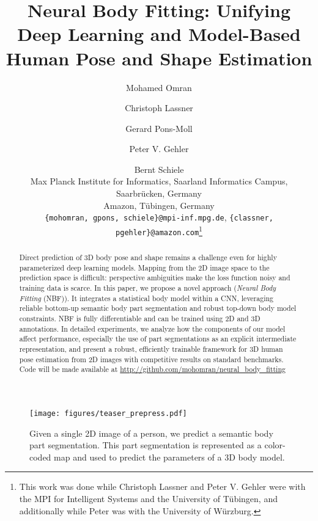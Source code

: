 \documentclass[10pt,twocolumn,letterpaper]{article}
\begin{document}
	
\title{Neural Body Fitting: Unifying Deep Learning and Model-Based Human Pose and Shape Estimation}

\author{Mohamed Omran\\
\and Christoph Lassner\footnotemark[1]\\
\and Gerard Pons-Moll\\
\and Peter V. Gehler\footnotemark[1]\\
\and Bernt Schiele\\Max Planck Institute for Informatics, Saarland Informatics Campus, Saarbr\"ucken, Germany\\
Amazon, T\"ubingen, Germany\\
{\tt\small \{mohomran, gpons, schiele\}@mpi-inf.mpg.de}, {\tt\small \{classner, pgehler\}@amazon.com}\thanks{This work was done while Christoph Lassner and Peter V. Gehler were with the MPI for Intelligent Systems and the University of T\"ubingen, and additionally while Peter was with the University of W\"urzburg.}\\
}

\maketitle

\begin{figure*}[t]
\caption{Given a single 2D image of a person, we predict a semantic body part segmentation. This part segmentation is represented as a color-coded map and used to predict the parameters of a 3D body model.}
\texttt{[image: figures/teaser\_prepress.pdf]}
\end{figure*}

\begin{abstract}
Direct prediction of 3D body pose and shape remains a challenge even for
highly parameterized deep learning models. Mapping from the 2D image space to 
the prediction space is difficult: perspective ambiguities make the loss
function noisy and training data is scarce. In this paper, we propose a novel 
approach (\emph{Neural Body Fitting} (NBF)).
It integrates a statistical body model within a CNN, leveraging reliable 
bottom-up semantic body part segmentation and robust top-down body model constraints. 
NBF is fully differentiable and can be trained using 2D and 3D annotations. 
In detailed experiments, we analyze how the components of our model affect performance, especially
the use of part segmentations as an explicit intermediate representation, and present a robust, efficiently trainable 
framework for 3D human pose estimation from 2D images with competitive results on standard benchmarks. 
Code will be made available at 
\url{http://github.com/mohomran/neural_body_fitting}
\end{abstract}
\end{document}
